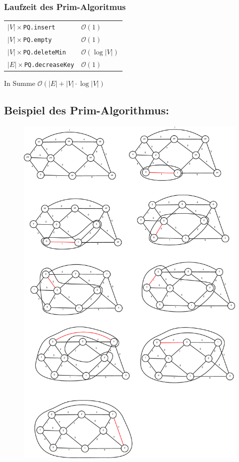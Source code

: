 \subsubsection{Laufzeit des Prim-Algoritmus}
\begin{tabular}{ll}
	$|V|\times$\texttt{PQ.insert}&$\mathcal{O}(1)$\\
	$|V|\times$\texttt{PQ.empty}&$\mathcal{O}(1)$\\
	$|V|\times$\texttt{PQ.deleteMin}&$\mathcal{O}(\log|V|)$\\
	$|E|\times$\texttt{PQ.decreaseKey}&$\mathcal{O}(1)$
\end{tabular}
In Summe $\mathcal{O}(|E|+|V|\cdot\log|V|)$

\newpage
\subsection{Beispiel des Prim-Algorithmus:}
\begin{figure}[H]
	\centering
	\includegraphics[width=0.65\linewidth]{20/Grafik/BspPrim}
	\caption{}
\end{figure}

